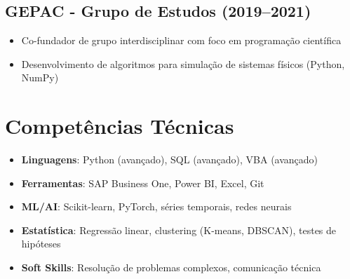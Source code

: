 \documentclass[11pt, a4paper]{article}
\begin{document}
\subsection*{GEPAC - Grupo de Estudos (2019–2021)}
\begin{itemize}
    \item Co-fundador de grupo interdisciplinar com foco em programação científica
    \item Desenvolvimento de algoritmos para simulação de sistemas físicos (Python, NumPy)
\end{itemize}

\section*{Competências Técnicas}
\begin{itemize}
    \item \textbf{Linguagens}: Python (avançado), SQL (avançado), VBA (avançado)
    \item \textbf{Ferramentas}: SAP Business One, Power BI, Excel, Git
    \item \textbf{ML/AI}: Scikit-learn, PyTorch, séries temporais, redes neurais
    \item \textbf{Estatística}: Regressão linear, clustering (K-means, DBSCAN), testes de hipóteses
    \item \textbf{Soft Skills}: Resolução de problemas complexos, comunicação técnica
\end{itemize}
\end{document}
